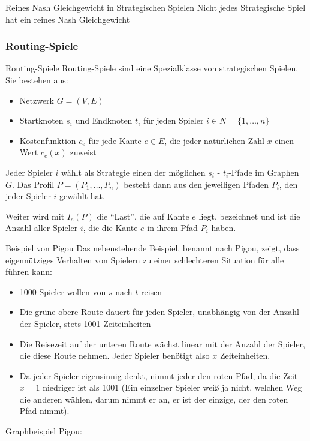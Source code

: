 \documentclass{panikzettel}
\newcommand{\boxspace}{	\vspace{-\baselineskip}	}
\begin{document}
{\begin{theo}{Reines Nash Gleichgewicht in Strategischen Spielen}
	Nicht jedes Strategische Spiel hat ein reines Nash Gleichgewicht
\end{theo}

\subsubsection{Routing-Spiele}

\begin{defi}{Routing-Spiele}
	Routing-Spiele sind eine Spezialklasse von strategischen Spielen. Sie bestehen aus:
	
	\begin{itemize}
		\item Netzwerk $G = (V,E)$
		\item Startknoten $s_i$ und Endknoten $t_i$ für jeden Spieler $i \in N = \{1, \dots, n\}$
		\item Kostenfunktion $c_e$ für jede Kante $e \in E$, die jeder natürlichen Zahl $x$ einen Wert $c_e(x)$ zuweist
	\end{itemize}

Jeder Spieler $i$ wählt als Strategie einen der möglichen $s_i$ - $t_i$-Pfade im Graphen $G$. Das Profil $P = (P_1, \dots, P_n)$ besteht dann aus den jeweiligen Pfaden $P_i$, den jeder Spieler $i$ gewählt hat.

Weiter wird mit $I_e(P)$ die ``Last'', die auf Kante $e$ liegt, bezeichnet und ist die Anzahl aller Spieler $i$, die die Kante $e$ in ihrem Pfad $P_i$ haben.
\end{defi}

\begin{halfboxl}
	\boxspace
\begin{theo}{Beispiel von Pigou}
	Das nebenstehende Beispiel, benannt nach Pigou, zeigt, dass eigennütziges Verhalten von Spielern zu einer schlechteren Situation für alle führen kann:
	
	\begin{itemize}
		\item 1000 Spieler wollen von $s$ nach $t$ reisen
		\item Die grüne obere Route dauert für jeden Spieler, unabhängig von der Anzahl der Spieler, stets 1001 Zeiteinheiten
		\item Die Reisezeit auf der unteren Route wächst linear mit der Anzahl der Spieler, die diese Route nehmen. Jeder Spieler benötigt also $x$ Zeiteinheiten.
		\item Da jeder Spieler eigensinnig denkt, nimmt jeder den roten Pfad, da die Zeit $x = 1$ niedriger ist als 1001 (Ein einzelner Spieler weiß ja nicht, welchen Weg die anderen wählen, darum nimmt er an, er ist der einzige, der den roten Pfad nimmt).
	\end{itemize}
\end{theo}
\end{halfboxl}%
\begin{halfboxr}
	\boxspace
	Graphbeispiel Pigou:
	

\end{halfboxr}}
\end{document}
